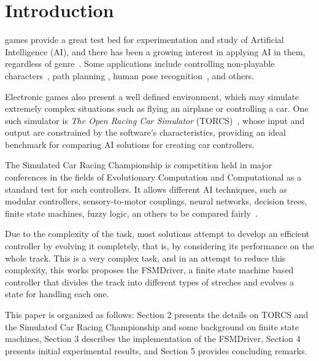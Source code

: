 \section{Introduction}
 games provide a great test bed for experimentation and 
study of Artificial Intelligence (AI), and there has been a growing interest in 
applying AI in them, regardless of genre~\cite{simon2008}. Some applications 
include controlling non-playable characters~\cite{stanley2005}, path planning 
\cite{freitas2012}, human pose recognition~\cite{shotton2011}, and others. 

Electronic games also present a well defined environment, which may simulate 
extremely complex situations such as flying an airplane or controlling a car. One such simulator is \emph{The Open Racing Car Simulator} (TORCS)~\cite{TORCS}, whose input and output are constrained by the software's characteristics, providing an ideal benchmark for comparing AI solutions for creating car controllers.

The Simulated Car Racing Championship is competition held in major conferences 
in the fields of Evolutionary Computation and Computational as a standard test
for such controllers. It allows different AI techniques, such as modular
controllers, sensory-to-motor couplings, neural networks, decision trees, finite
state machines, fuzzy logic, an others to be compared fairly~\cite{scr2009}. 

Due to  the complexity of the task, most solutions attempt to develop an efficient
controller by evolving it completely, that is, by considering its performance on
the whole track. This is a very complex task, and in an attempt to
reduce this complexity, this works proposes the FSMDriver, a finite state machine based controller that divides the track into different types of streches and evolves a state for handling each one.

 This paper is organized as follows: Section 2 presents the details on TORCS and 
 the Simulated Car Racing Championship and some background on finite state machines,
 Section 3 describes the implementation of the FSMDriver, Section 4 presents 
 initial experimental results, and Section 5 provides concluding remarks.